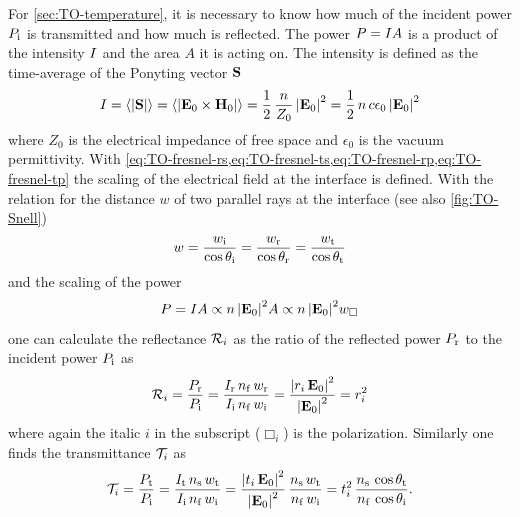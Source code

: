 For \cref{sec:TO-temperature}, it is necessary to know how much of the incident 
power $P_{\mathrm{i}}$ is transmitted and how much is reflected. The power 
$P=I A$ is a product of the intensity $I$ and the area $A$ it 
is acting on. The intensity is defined as the time-average of the Ponyting 
vector $\vb{S}$
\begin{equation}
  I = \left\langle \abs{\vb{S}} \right\rangle = 
  \left\langle \abs{\vb{E}_{0}\times\vb{H}_{0}} \right\rangle = 
  \frac{1}{2}\,\frac{n}{Z_{0}}\,\abs{\vb{E}_{0}}^{2} = 
  \frac{1}{2}\,n\,c\epsilon_{0}\,\abs{\vb{E}_{0}}^{2}
\end{equation}
where $Z_{0}$ is the electrical impedance of free space and $\epsilon_{0}$ is 
the vacuum permittivity. With 
\cref{eq:TO-fresnel-rs,eq:TO-fresnel-ts,eq:TO-fresnel-rp,eq:TO-fresnel-tp} the 
scaling of the electrical field at the interface is defined. With the relation 
for the distance $w$ of two parallel rays at the interface (see also 
\cref{fig:TO-Snell})
\begin{equation}
  w = \frac{w_{\mathrm{i}}}{\cos\theta_{\mathrm{i}}} = \frac{w_{\mathrm{r}}}{\cos\theta_{\mathrm{r}}} = 
  \frac{w_{\mathrm{t}}}{\cos\theta_{\mathrm{t}}}
  \label{eq:TO-area}
\end{equation}
and the scaling of the power
\begin{equation}
  P = I A \propto n\,\abs{\vb{E}_{0}}^{2}A \propto
  n\,\abs{\vb{E}_{0}}^{2}w_{\Box}
\end{equation}
one can calculate the reflectance $\mathcal{R}_{i}$ as the ratio of the reflected 
power $P_{\mathrm{r}}$ to the incident power $P_{\mathrm{i}}$ as
\begin{equation}
  \mathcal{R}_{i} = \frac{P_{\mathrm{r}}}{P_{\mathrm{i}}} = 
  \frac{I_{\mathrm{r}}\,n_{\mathrm{f}}\,w_{\mathrm{r}}}{I_{\mathrm{i}}\,n_{\mathrm{f}}\,w_{\mathrm{i}}} 
  =\frac{\abs{r_{i}\,\vb{E}_{0}}^{2}}{\abs{\vb{E}_{0}}^{2}} = 
  r_{i}^{2}
  \label{eq:TO-fresnelR}
\end{equation}
where again the italic $i$ in the subscript ($\Box_{i}$) is the polarization. 
Similarly one finds the transmittance $\mathcal{T}_{i}$ as
\begin{equation}
  \mathcal{T}_{i} = \frac{P_{\mathrm{t}}}{P_{\mathrm{i}}} = 
  \frac{I_{\mathrm{t}}\,n_{\mathrm{s}}\,w_{\mathrm{t}}}{I_{\mathrm{i}}\,n_{\mathrm{f}}\,w_{\mathrm{i}}} 
  =\frac{\abs{t_{i}\,\vb{E}_{0}}^{2}}{\abs{\vb{E}_{0}}^{2}}\,\frac{n_{\mathrm{s}}\,w_{\mathrm{t}}}{n_{\mathrm{f}}\,w_{\mathrm{i}}} 
  = t_{i}^{2}\,\frac{n_{\mathrm{s}}\,\cos\theta_{\mathrm{t}}}{n_{\mathrm{f}}\,\cos\theta_{\mathrm{i}}}.
  \label{eq:TO-fresnelT}
\end{equation}
